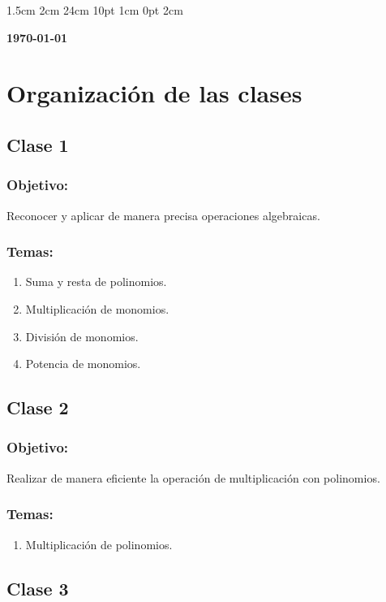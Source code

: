 \documentclass[12pt,letterpaper]{report}
\begin{document}
\setmargins{2.5cm}      
{1.5cm}                     
{2cm}  
{24cm}                    
{10pt}                          
{1cm}                          
{0pt}                             
{2cm}
\begin{flushright}
\textbf{\today}
\end{flushright}
\vspace{-1.8cm}
\section*{Organización de las clases}
\subsection*{Clase 1}
\subsubsection*{Objetivo:}
Reconocer y aplicar de manera precisa operaciones algebraicas.
\subsubsection*{Temas:}
\begin{enumerate}
    \item Suma y resta de polinomios.
    \item Multiplicación de monomios.
    \item División de monomios.
    \item Potencia de monomios.
\end{enumerate}
\subsection*{Clase 2}
\subsubsection*{Objetivo:}
Realizar de manera eficiente la operación de multiplicación con polinomios.
\subsubsection*{Temas:}
\begin{enumerate}
    \item Multiplicación de polinomios.
\end{enumerate}
\subsection*{Clase 3}
\end{document}
